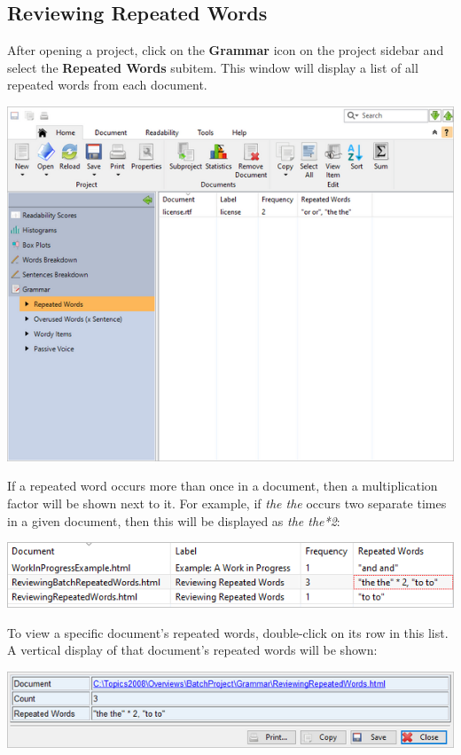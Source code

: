 \documentclass[
]{book}
\theoremstyle{definition}
\theoremstyle{definition}
\theoremstyle{definition}
\theoremstyle{definition}
\theoremstyle{remark}
\begin{document}
\hypertarget{reviewing-batch-repeated-words}{%
\subsection*{Reviewing Repeated Words}\label{reviewing-batch-repeated-words}}

After opening a project, click on the \textbf{Grammar} icon on the project sidebar and select the \textbf{Repeated Words} subitem. This window will display a list of all repeated words from each document.

\includegraphics{Images/batchrepeatedwords.png}

If a repeated word occurs more than once in a document, then a multiplication factor will be shown next to it. For example, if \emph{the the} occurs two separate times in a given document, then this will be displayed as \emph{the the*2}:

\includegraphics{Images/batchrepeatedmultiple.png}

To view a specific document's repeated words, double-click on its row in this list. A vertical display of that document's repeated words will be shown:

\includegraphics{Images/batchrepeatedviewitem.png}
\end{document}
